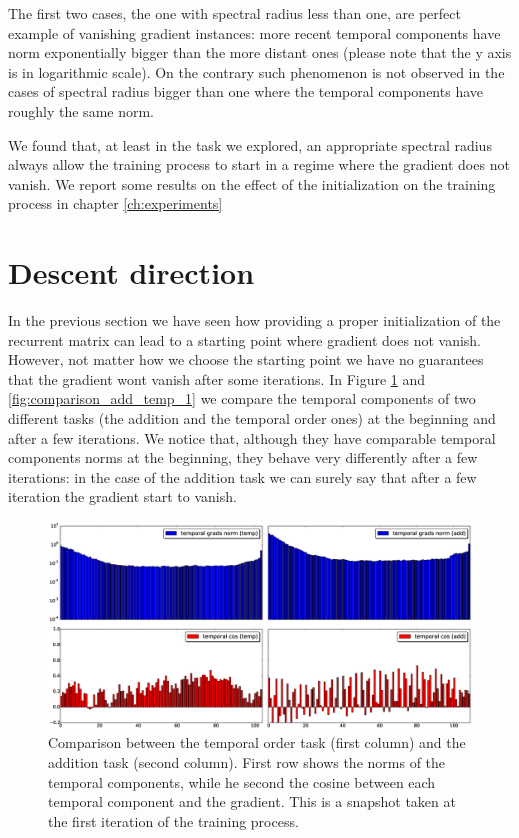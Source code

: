 The first two cases, the one with spectral radius less than one, are perfect example of vanishing gradient instances: more recent temporal components have norm exponentially bigger than the more distant ones (please note that the y axis is in logarithmic scale). On the contrary such phenomenon is not observed in the cases of spectral radius bigger than one where the temporal components have roughly the same norm.

We found that, at least in the task we explored, an appropriate spectral radius always allow the training process to start in a regime where the gradient does not vanish. We report some results on the effect of the initialization on the training process in chapter \ref{ch:experiments}

\section{Descent direction}
In the previous section we have seen how providing a proper initialization of the recurrent matrix can lead to a starting point where gradient does not vanish. However, not matter how we choose the starting point we have no guarantees that the gradient wont vanish after some iterations. In Figure \ref{fig:comparison_add_temp_0} and \ref{fig:comparison_add_temp_1} we compare the temporal components of two different tasks (the addition and the temporal order ones) at the beginning and after a few iterations.
We notice that, although they have comparable temporal components norms at the beginning, they behave very differently after a few iterations: in the case of the addition task we can surely say that after a few iteration the gradient start to vanish.

\begin{figure}[h]
	\includegraphics[width=1\textwidth]{chapter3/compare_add_temp_norms_0.eps}
	\caption{Comparison between the temporal order task (first column) and the addition task (second column). First row shows the norms of the temporal components, while he second the cosine between each temporal component and the gradient. This is a snapshot taken at the first iteration of the training process.}
	\label{fig:comparison_add_temp_0}
\end{figure}

